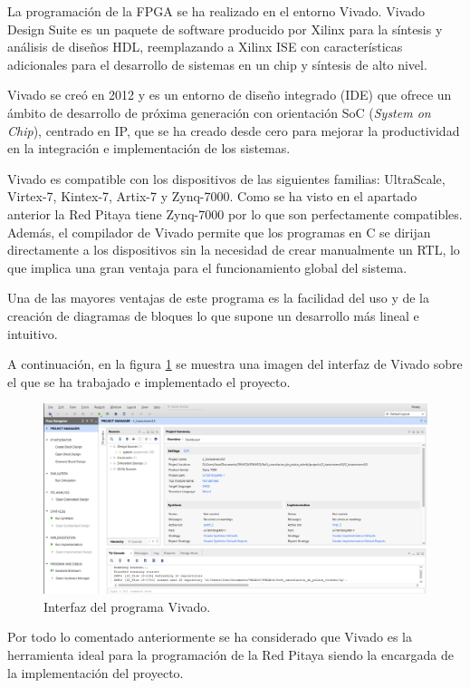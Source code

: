 La programación de la FPGA se ha realizado en el entorno Vivado. Vivado Design Suite
es un paquete de software producido por Xilinx para la síntesis y análisis de diseños 
HDL, reemplazando a Xilinx ISE con características adicionales para el desarrollo de 
sistemas en un chip y síntesis de alto nivel. 

Vivado se creó en 2012 y es un entorno de diseño integrado (IDE) que ofrece un ámbito
de desarrollo de próxima generación con orientación SoC (\textit{System on Chip}), 
centrado en IP,
que se ha creado desde cero para mejorar la productividad en la integración e 
implementación de los sistemas. \cite{vivado}

Vivado es compatible con los dispositivos de las siguientes familias: UltraScale, 
Virtex-7, Kintex-7, Artix-7 y Zynq-7000. Como se ha visto en el apartado anterior la 
Red Pitaya tiene Zynq-7000 por lo que son perfectamente compatibles. Además, el 
compilador de Vivado permite que los programas en C se dirijan directamente a los 
dispositivos sin la necesidad de crear manualmente un RTL, lo que implica una gran 
ventaja para el funcionamiento global del sistema. \cite{vivado}

Una de las mayores ventajas de este programa es la facilidad del uso y de la creación
de diagramas de bloques lo que supone un desarrollo más lineal e intuitivo. 

A continuación, en la figura \ref{vivado}
se muestra una imagen del interfaz de Vivado sobre el que se ha 
trabajado e implementado el proyecto.

\begin{figure}[ht]
    \centering
    \includegraphics[scale=0.37]{./figuras/vivadoo.png}
    \caption{\small{Interfaz del programa Vivado.}}
    \label{vivado}%
\end{figure}
\newpage
Por todo lo comentado anteriormente se ha considerado que Vivado es la herramienta 
ideal para la programación de la Red Pitaya siendo la encargada de la implementación del 
proyecto. 

